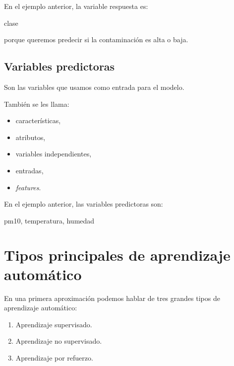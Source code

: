 \documentclass[
  11pt,
  letterpaper,
]{book}
\newenvironment{Shaded}{\begin{snugshade}}{\end{snugshade}}
\newcommand{\NormalTok}[1]{\textcolor[rgb]{0.00,0.23,0.31}{#1}}
\providecommand{\tightlist}{%
  \setlength{\itemsep}{0pt}\setlength{\parskip}{0pt}}
\begin{document}
En el ejemplo anterior, la variable respuesta es:

\begin{Shaded}
\begin{Highlighting}[]
\NormalTok{clase}
\end{Highlighting}
\end{Shaded}

porque queremos predecir si la contaminación es alta o baja.

\subsection{Variables predictoras}\label{variables-predictoras}

Son las variables que usamos como entrada para el modelo.

También se les llama:

\begin{itemize}
\tightlist
\item
  características,
\item
  atributos,
\item
  variables independientes,
\item
  entradas,
\item
  \emph{features}.
\end{itemize}

En el ejemplo anterior, las variables predictoras son:

\begin{Shaded}
\begin{Highlighting}[]
\NormalTok{pm10, temperatura, humedad}
\end{Highlighting}
\end{Shaded}

\section{Tipos principales de aprendizaje
automático}\label{tipos-principales-de-aprendizaje-automuxe1tico}

En una primera aproximación podemos hablar de tres grandes tipos de
aprendizaje automático:

\begin{enumerate}
\def\labelenumi{\arabic{enumi}.}
\tightlist
\item
  Aprendizaje supervisado.
\item
  Aprendizaje no supervisado.
\item
  Aprendizaje por refuerzo.
\end{enumerate}
\end{document}
